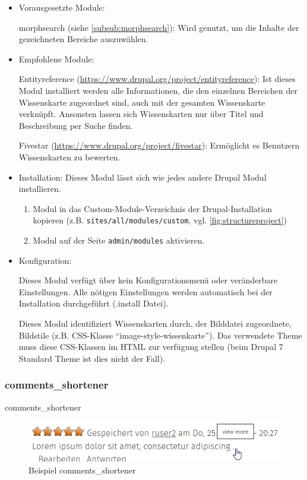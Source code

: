 \begin{itemize}[parsep=0pt, itemsep=5.0pt plus 2.0pt minus 1.0pt, leftmargin=*]
	\item Vorausgesetzte Module:
	
	morphsearch (siehe \cref{subsub:morphsearch}): Wird genutzt, um die Inhalte der gezeichneten Bereiche auszuwählen.
	
	
	\item Empfohlene Module: 
	
	Entityreference (\url{https://www.drupal.org/project/entityreference}): Ist dieses Modul installiert werden alle Informationen, die den einzelnen Bereichen der Wissenskarte zugeordnet sind, auch mit der gesamten Wissenskarte verknüpft. Ansonsten lassen sich Wissenskarten nur über Titel und Beschreibung per Suche finden.
	
	Fivestar (\url{https://www.drupal.org/project/fivestar}): Ermöglicht es Benutzern Wissenskarten zu bewerten.
	
	
	\item Installation: Dieses Modul lässt sich wie jedes andere Drupal Modul installieren.
	\begin{enumerate}
		\item Modul in das Custom-Module-Verzeichnis der Drupal-Installation kopieren  (z.B. \lstinline|sites/all/modules/custom|, vgl. \cref{fig:structureproject})
		\item Modul auf der Seite \lstinline|admin/modules| aktivieren.
	\end{enumerate}
	
	
	\item Konfiguration:
	
	Dieses Modul verfügt über kein Konfigurationsmenü oder veränderbare Einstellungen.
	Alle nötigen Einstellungen werden automatisch bei der Installation durchgeführt (.install Datei).

	Dieses Modul identifiziert Wissenskarten durch, der Bilddatei zugeordnete, Bildstile (z.B. CSS-Klasse \enquote{image-style-wissenkarte}). Das verwendete Theme muss diese CSS-Klassen im HTML zur verfügung stellen (beim Drupal 7 Standard Theme ist dies nicht der Fall).
\end{itemize}



\subsubsection{comments\_shortener}\label{subsub:commentsshortener}
comments\_shortener
\begin{figure}[H]
	\centering
	\includegraphics[width=0.50\linewidth]{images/example_commentsshortener}
	\caption{Beispiel comments\_shortener}
	\label{fig:example_commentshortener}
\end{figure}


